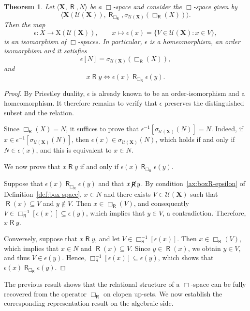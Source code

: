 \documentclass{article}
\newtheorem{theorem}{Theorem}[section]
\DeclareMathOperator{\R}{\mathsf{R}}
\DeclareMathOperator{\notR}{\cancel{ \R}}
\newcommand{\X}{\mathbf{X}}
\newcommand{\U}{\mathcal{U}}
\begin{document}
\begin{theorem}
\label{thm:epsilon-box-morphism}
Let $\langle \X,\R,N\rangle$ be a $\Box$-space and consider the $\Box$-space given by 
\[
\langle \X(\U(\X)), \R_{\Box_{\R}}, \sigma_{\U(\X)}(\Box_{\R}(X))\rangle.
\] 
Then the map
\[
\epsilon \colon X \longrightarrow \mathrm{X}(\U(\X)), \qquad x \mapsto \epsilon(x) = \{V \in \U(\X) : x \in V\},
\]
is an isomorphism of $\Box$-spaces. In particular, $\epsilon$ is a homeomorphism, an order isomorphism and it satisfies
\[
\epsilon[N]=\sigma_{\U(\X)}(\Box_{\R}(X)),
\]
and 
\[
x \R y\iff \epsilon(x)\R_{\Box_{\R}} \epsilon(y).
\]
\end{theorem}
\begin{proof}
By Priestley duality, $\epsilon$ is already known to be an order-isomorphism and a homeomorphism. It therefore remains to verify that $\epsilon$ preserves the distinguished subset and the relation.

Since $\Box_{\R}(X)=N$, it suffices to prove that $\epsilon^{-1}[\sigma_{\U(\X)}(N)] = N$. Indeed, if $x \in \epsilon^{-1}[\sigma_{\U(\X)}(N)]$, then $\epsilon(x) \in \sigma_{\U(\X)}(N)$, which holds if and only if $N \in \epsilon(x)$, and this is equivalent to $x \in N$.

We now prove that $x \R y$ if and only if $\epsilon(x)\R_{\Box_{\R}} \epsilon(y)$.

Suppose that $\epsilon(x)\R_{\Box_{\R}} \epsilon(y)$ and that $x \notR y$. By condition~\ref{ax:boxR-epsilon} of Definition~\ref{def:box-space}, $x \in N$ and there exists $V \in \U(\X)$ such that $\R(x) \subseteq V$ and $y \notin V$. Then $x \in \Box_{\R}(V)$, and consequently $V \in \Box_{\R}^{-1}[\epsilon(x)] \subseteq \epsilon(y)$, which implies that $y \in V$, a contradiction. Therefore, $x\R y$.

Conversely, suppose that $x\R y$, and let $V \in \Box_{\R}^{-1}[\epsilon(x)]$. Then $x \in \Box_{\R}(V)$, which implies that $x \in N$ and $\R(x) \subseteq V$. Since $y \in \R(x)$, we obtain $y \in V$, and thus $V \in \epsilon(y)$. Hence, $\Box_{\R}^{-1}[\epsilon(x)] \subseteq \epsilon(y)$, which shows that $\epsilon(x)\R_{\Box_{\R}} \epsilon(y)$.
\end{proof}

The previous result shows that the relational structure of a $\Box$-space can be fully recovered from the operator $\Box_{\R}$ on clopen up-sets. We now establish the corresponding representation result on the algebraic side.
\end{document}

